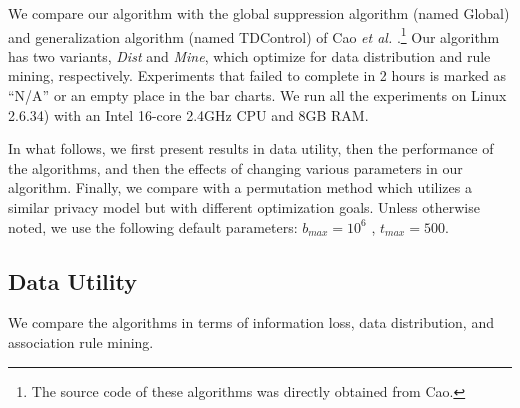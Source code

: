We compare our algorithm with the
global suppression algorithm (named Global) and generalization algorithm 
(named TDControl) of
Cao {\em et al.} \cite{Cao:2010:rho}.\footnote{The source code of these
algorithms was directly obtained from Cao.} 
Our algorithm has two variants, {\em Dist} and {\em Mine}, which optimize
for data distribution and rule mining, respectively.
Experiments that failed to complete in 2 hours is marked
as ``N/A'' or an empty place in the bar charts.
We run all the experiments on Linux 2.6.34)
with an Intel 16-core 2.4GHz CPU and 8GB RAM. 

In what follows, we first present results in data utility, then the
performance of the algorithms, and then the effects of
changing various parameters in our algorithm. 
Finally, we compare with a permutation method which utilizes
a similar privacy model but with different optimization goals. 
Unless otherwise noted, we use the following default parameters: 
$b_{max} = 10^6$ , $t_{max}=500$. 

\subsection{Data Utility}\label{sec:eval:datautility}
We compare the algorithms in terms of information loss, data distribution,
and association rule mining.

